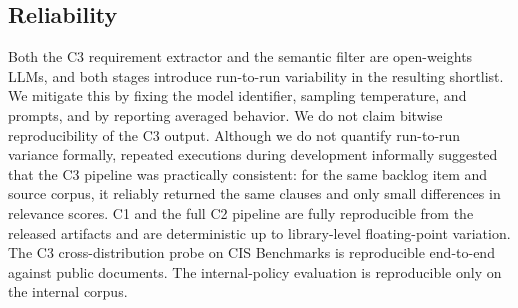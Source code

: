 \subsection{Reliability}

Both the C3 requirement extractor and the semantic filter are open-weights LLMs, and both stages introduce run-to-run variability in the resulting shortlist.
We mitigate this by fixing the model identifier, sampling temperature, and prompts, and by reporting averaged behavior.
We do not claim bitwise reproducibility of the C3 output.
Although we do not quantify run-to-run variance formally, repeated executions during development informally suggested that the C3 pipeline was practically consistent: for the same backlog item and source corpus, it reliably returned the same clauses and only small differences in relevance scores.
C1 and the full C2 pipeline are fully reproducible from the released artifacts and are deterministic up to library-level floating-point variation.
The C3 cross-distribution probe on CIS Benchmarks is reproducible end-to-end against public documents. The internal-policy evaluation is reproducible only on the internal corpus.
